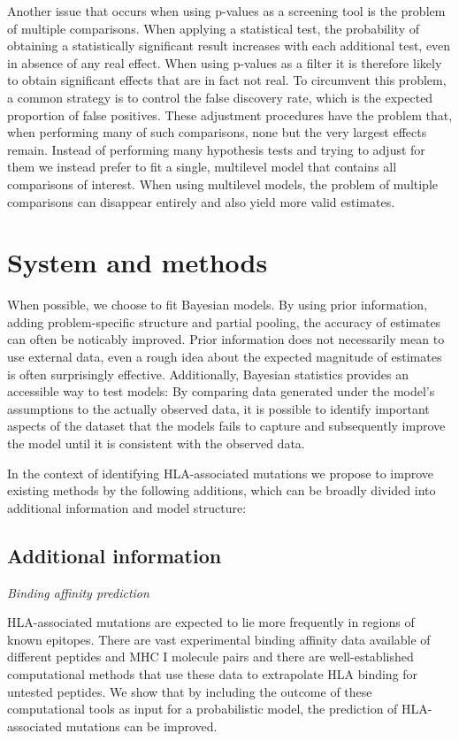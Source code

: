 \documentclass[fleqn,11pt]{SelfArx} %
\begin{document}
Another issue that occurs when using p-values as a screening tool is the problem
of multiple comparisons. When applying a statistical test, the probability  of 
obtaining a statistically significant result increases with
each additional test, even in absence of any real effect. When using p-values as a filter
it is therefore likely to obtain significant effects that are in fact not real.
To circumvent this problem, a common strategy is to control the false discovery
rate, which is the expected proportion of false positives.
These adjustment procedures have the problem that, when performing many of such comparisons,
none but the very largest effects remain.
Instead of performing many hypothesis tests and trying to adjust for them we instead prefer
to fit a single, multilevel model that contains all comparisons of interest.
When using multilevel models, the problem of multiple comparisons can disappear entirely and 
also yield more valid estimates.


\section{System and methods}

When possible, we choose to fit Bayesian models. By using prior information,
adding problem-specific structure and partial pooling, the accuracy of estimates
can often be noticably improved. Prior information does not necessarily mean to
use external data, even a rough idea about the expected magnitude of estimates is often
surprisingly effective.
Additionally, Bayesian statistics provides an accessible way to test models:
By comparing data generated under the model's assumptions to the actually observed data,
it is possible to identify important aspects of the dataset that the models fails to
capture and subsequently improve the model until it is consistent with the observed data.

In the context of identifying HLA-associated mutations we propose to improve existing
methods by the following additions, which can be broadly divided into additional information
and model structure:
\subsection*{Additional information}

  \textit{Binding affinity prediction}

    HLA-associated mutations are expected to lie more frequently in regions of known
    epitopes. There are vast experimental binding affinity data available of different
    peptides and MHC I molecule pairs and there are well-established computational
    methods that use these data to extrapolate HLA binding for untested peptides.
    We show that by including the outcome of these computational tools as input for a
    probabilistic model, the prediction of HLA-associated mutations can be improved.
\end{document}
